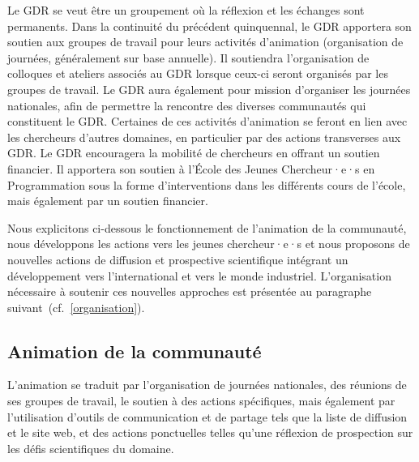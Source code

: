 \documentclass[11pt]{article}
\newcommand{\cf}[0]{cf.~}
\begin{document}

Le GDR se veut être un groupement où la réflexion et les échanges sont permanents.
Dans la continuité du précédent quinquennal, le GDR apportera  son soutien aux groupes de travail pour leurs activités d'animation (organisation de journées, généralement sur base annuelle). 
Il soutiendra l'organisation de colloques et ateliers associés au GDR lorsque ceux-ci seront organisés par les groupes de travail.
Le GDR aura également pour mission d'organiser les journées nationales, afin de permettre la rencontre des diverses communautés qui constituent le GDR. Certaines de ces activités d'animation se feront en lien avec les chercheurs d'autres domaines, en particulier par des actions transverses aux GDR.
Le GDR encouragera la mobilité de chercheurs en offrant un soutien financier. Il apportera son soutien à l'École des Jeunes Chercheur·e·s en Programmation sous la forme d'interventions dans les différents cours de l'école, mais également par un soutien financier. 

Nous explicitons ci-dessous le fonctionnement de l'animation de la communauté, nous développons les actions vers les jeunes chercheur·e·s et nous  proposons de nouvelles actions de diffusion et prospective scientifique intégrant un  développement vers l'international et vers le monde industriel.
L'organisation nécessaire à soutenir ces nouvelles approches est présentée au paragraphe suivant~(\cf \ref{organisation}).

\subsection{Animation de la communauté}
L'animation se traduit par
    l'organisation de journées nationales, 
    des réunions de ses groupes de travail,
    le soutien à des actions spécifiques, 
    mais également par l'utilisation d'outils de communication
    et de partage tels que la liste de diffusion et le site web, et des actions ponctuelles telles qu'une réflexion de prospection sur les défis scientifiques du domaine.
    
\end{document}
